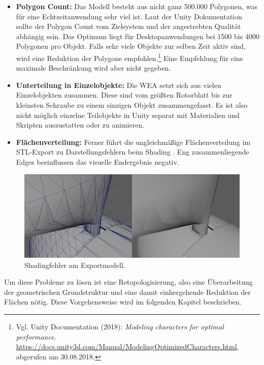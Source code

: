 \begin{itemize}
\item \textbf{Polygon Count:} Das Modell besteht aus nicht ganz 500.000 Polygonen, was für eine Echtzeitanwendung sehr viel ist. Laut der Unity Dokumentation sollte der Polygon Count vom Zielsystem und der angestrebten Qualität abhängig sein. Das Optimum liegt für Desktopanwendungen bei 1500 bis 4000 Polygonen pro Objekt. Falls sehr viele Objekte zur selben Zeit aktiv sind, wird eine Reduktion der Polygone empfohlen.\footnote{Vgl. Unity Documentation  (2018): \textit{Modeling characters for optimal performance}.\newline
\url{https://docs.unity3d.com/Manual/ModelingOptimizedCharacters.html},\newline 
abgerufen am 30.08.2018.} Eine Empfehlung für eine maximale Beschränkung wird aber nicht gegeben.      

\item \textbf{Unterteilung in Einzelobjekte:} Die WEA setzt sich aus vielen Einzelobjekten zusammen. Diese sind vom größten Rotorblatt bis zur kleinsten Schraube zu einem einzigen Objekt zusammengefasst. Es ist also nicht möglich einzelne Teilobjekte in Unity separat mit Materialien und Skripten auszustatten oder zu animieren.  

\item \textbf{Flächenverteilung:} Ferner führt die ungleichmäßige Flächenverteilung im STL-Export zu Darstellungsfehlern beim Shading . Eng zusammenliegende Edges beeinflussen das visuelle Endergebnis negativ.
\end{itemize}

\begin{figure}[H]
	\centering
	\captionsetup{width=1\textwidth}
	\includegraphics[keepaspectratio, width=1\textwidth]{bildquellen/WEAfehlerhaftesshading}
	\caption{Shadingfehler am Exportmodell.}
	\label{fig:2.3}
\end{figure}

Um diese Probleme zu lösen ist eine Retopologisierung, also eine Überarbeitung der geometrischen Grundstruktur und eine damit einhergehende Reduktion der Flächen nötig. Diese Vorgehensweise wird im folgenden Kapitel  beschrieben.

